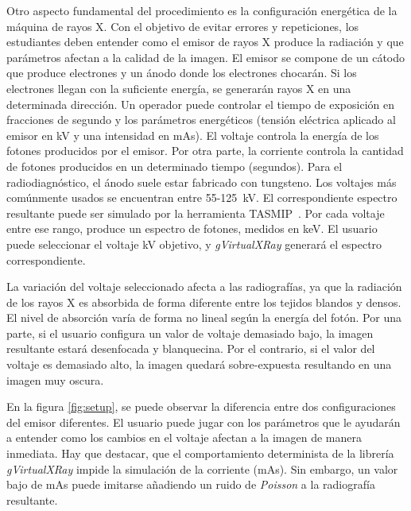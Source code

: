 Otro aspecto fundamental del procedimiento es la configuración energética de la máquina de rayos X. Con el objetivo de evitar errores y repeticiones, los estudiantes deben entender como el emisor de rayos X produce la radiación y que parámetros afectan a la calidad de la imagen. El emisor se compone de un cátodo que produce electrones y un ánodo donde los electrones chocarán. Si los electrones llegan con la suficiente energía, se generarán rayos X en una determinada dirección. Un operador puede controlar el tiempo de exposición en fracciones de segundo y los parámetros energéticos (tensión eléctrica aplicado al emisor en \ac{kV} y una intensidad en \ac{mAs}). El voltaje controla la energía de los fotones producidos por el emisor. Por otra parte, la corriente controla la cantidad de fotones producidos en un determinado tiempo (segundos). 
Para el radiodiagnóstico, el ánodo suele estar fabricado con tungsteno. Los voltajes más comúnmente usados se encuentran entre 55-125~\ac{kV}. El correspondiente espectro resultante puede ser simulado por la herramienta \ac{TASMIP}~\cite{Boone1997}. Por cada voltaje entre ese rango, produce un espectro de fotones, medidos en \ac{keV}. El usuario puede seleccionar el voltaje \ac{kV} objetivo, y \emph{gVirtualXRay} generará el espectro correspondiente.

La variación del voltaje seleccionado afecta a las radiografías, ya que la radiación de los rayos X es absorbida de forma diferente entre los tejidos blandos y densos. El nivel de absorción varía de forma no lineal según la energía del fotón. 
Por una parte, si el usuario configura un valor de voltaje demasiado bajo, la imagen resultante estará desenfocada y blanquecina. Por el contrario, si el valor del voltaje es demasiado alto, la imagen quedará sobre-expuesta resultando en una imagen muy oscura.

En la figura \ref{fig:setup}, se puede observar la diferencia entre dos configuraciones del emisor diferentes. El usuario puede jugar con los parámetros que le ayudarán a entender como los cambios en el voltaje afectan a la imagen de manera inmediata. Hay que destacar, que el comportamiento determinista de la librería \emph{gVirtualXRay} impide la simulación de la corriente (\acs{mAs}). Sin embargo, un valor bajo de \ac{mAs} puede imitarse añadiendo un ruido de \emph{Poisson} a la radiografía resultante.



